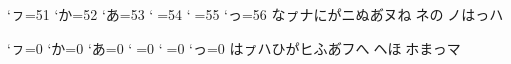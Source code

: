 \postbreakpenalty`ㇷ=51
\postbreakpenalty`か=52
\postbreakpenalty`あ=53
\postbreakpenalty`𛂦=54
\postbreakpenalty`𛂱=55
\postbreakpenalty`っ=56
\hbox{なㇷ゚ナにか゚ニぬあ゙ヌね𛂦゙ネの𛂱゚ノはっハ}

\prebreakpenalty`ㇷ=0
\postbreakpenalty`か=0
\prebreakpenalty`あ=0
\postbreakpenalty`𛂦=0
\prebreakpenalty`𛂱=0
\postbreakpenalty`っ=0
\hbox{はㇷ゚ハひか゚ヒふあ゙フへ𛂦゙ヘほ𛂱゚ホまっマ}

\fi
\fi

\bye

